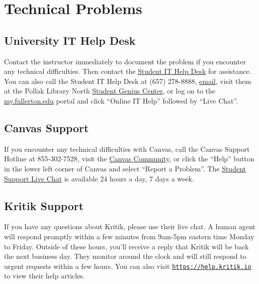 \documentclass[10pt, letterpaper]{article}
\begin{document}
    \section*{Technical Problems}
    
    \subsection*{University IT Help Desk}
    
    Contact the instructor immediately to document the problem if you encounter any technical difficulties. Then contact the \href{http://www.fullerton.edu/it/students/helpdesk/index.php}{Student IT Help Desk} for assistance. You can also call the Student IT Help Desk at (657) 278-8888, \href{mailto:StudentITHelpDesk@fullerton.edu}{email}, visit them at the Pollak Library North \href{http://www.fullerton.edu/it/students/sgc/index.php}{Student Genius Center}, or log on to the \href{http://my.fullerton.edu/}{my.fullerton.edu} portal and click ``Online IT Help'' followed by ``Live Chat''.
    
    \subsection*{Canvas Support}
    
    If you encounter any technical difficulties with Canvas, call the Canvas Support Hotline at 855-302-7528, visit the \href{https://community.canvaslms.com/docs/DOC-10720-67952720329}{Canvas Community}, or click the ``Help'' button in the lower left corner of Canvas and select ``Report a Problem''. The \href{https://cases.canvaslms.com/liveagentchat?chattype=student&sfid=001A000000YzcwQIAR}{Student Support Live Chat} is available 24 hours a day, 7 days a week.
    
    \subsection*{Kritik Support}
    
    If you have any questions about Kritik, please use their live chat. A human agent will respond promptly within a few minutes from 9am-5pm eastern time Monday to Friday. Outside of these hours, you’ll receive a reply that Kritik will be back the next business day. They monitor around the clock and will still respond to urgent requests within a few hours. You can also visit \href{https://help.kritik.io}{\texttt{https://help.kritik.io}} to view their help articles.
    
\end{document}
